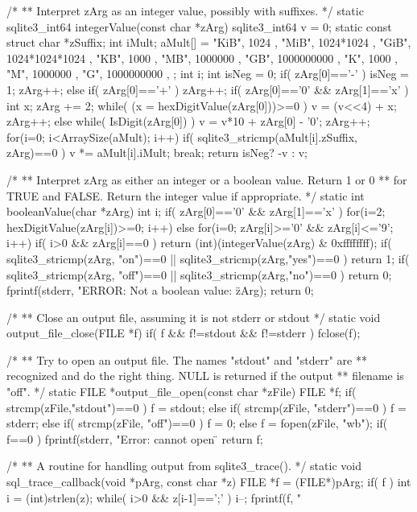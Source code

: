 \begin{Codex}[label=shell.c,numbers=left]
{/*
** Interpret zArg as an integer value, possibly with suffixes.
*/
static sqlite3_int64 integerValue(const char *zArg){
  sqlite3_int64 v = 0;
  static const struct { char *zSuffix; int iMult; } aMult[] = {
    { "KiB", 1024 },
    { "MiB", 1024*1024 },
    { "GiB", 1024*1024*1024 },
    { "KB",  1000 },
    { "MB",  1000000 },
    { "GB",  1000000000 },
    { "K",   1000 },
    { "M",   1000000 },
    { "G",   1000000000 },
  };
  int i;
  int isNeg = 0;
  if( zArg[0]=='-' ){
    isNeg = 1;
    zArg++;
  }else if( zArg[0]=='+' ){
    zArg++;
  }
  if( zArg[0]=='0' && zArg[1]=='x' ){
    int x;
    zArg += 2;
    while( (x = hexDigitValue(zArg[0]))>=0 ){
      v = (v<<4) + x;
      zArg++;
    }
  }else{
    while( IsDigit(zArg[0]) ){
      v = v*10 + zArg[0] - '0';
      zArg++;
    }
  }
  for(i=0; i<ArraySize(aMult); i++){
    if( sqlite3_stricmp(aMult[i].zSuffix, zArg)==0 ){
      v *= aMult[i].iMult;
      break;
    }
  }
  return isNeg? -v : v;
}

/*
** Interpret zArg as either an integer or a boolean value.  Return 1 or 0
** for TRUE and FALSE.  Return the integer value if appropriate.
*/
static int booleanValue(char *zArg){
  int i;
  if( zArg[0]=='0' && zArg[1]=='x' ){
    for(i=2; hexDigitValue(zArg[i])>=0; i++){}
  }else{
    for(i=0; zArg[i]>='0' && zArg[i]<='9'; i++){}
  }
  if( i>0 && zArg[i]==0 ) return (int)(integerValue(zArg) & 0xffffffff);
  if( sqlite3_stricmp(zArg, "on")==0 || sqlite3_stricmp(zArg,"yes")==0 ){
    return 1;
  }
  if( sqlite3_stricmp(zArg, "off")==0 || sqlite3_stricmp(zArg,"no")==0 ){
    return 0;
  }
  fprintf(stderr, "ERROR: Not a boolean value: \"%
          zArg);
  return 0;
}

/*
** Close an output file, assuming it is not stderr or stdout
*/
static void output_file_close(FILE *f){
  if( f && f!=stdout && f!=stderr ) fclose(f);
}

/*
** Try to open an output file.   The names "stdout" and "stderr" are
** recognized and do the right thing.  NULL is returned if the output 
** filename is "off".
*/
static FILE *output_file_open(const char *zFile){
  FILE *f;
  if( strcmp(zFile,"stdout")==0 ){
    f = stdout;
  }else if( strcmp(zFile, "stderr")==0 ){
    f = stderr;
  }else if( strcmp(zFile, "off")==0 ){
    f = 0;
  }else{
    f = fopen(zFile, "wb");
    if( f==0 ){
      fprintf(stderr, "Error: cannot open \"%
    }
  }
  return f;
}

/*
** A routine for handling output from sqlite3_trace().
*/
static void sql_trace_callback(void *pArg, const char *z){
  FILE *f = (FILE*)pArg;
  if( f ){
    int i = (int)strlen(z);
    while( i>0 && z[i-1]==';' ){ i--; }
    fprintf(f, "%
  }
}

}
\end{Codex}
